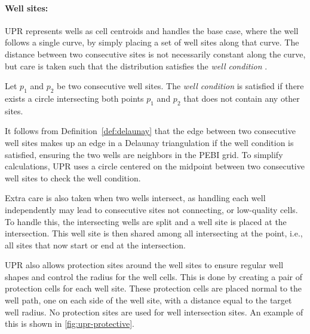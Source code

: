 \paragraph{Well sites:}
\label{UPR:wells}
UPR represents wells as cell centroids and handles the base case, where the well follows a single curve, by simply placing a set of well sites along that curve. The distance between two consecutive sites is not necessarily constant along the curve, but care is taken such that the distribution satisfies the \emph{well condition} \cite{UPR_thesis}.

\begin{definition}
Let $p_1$ and $p_2$ be two consecutive well sites. The \emph{well condition} is satisfied if there exists a circle intersecting both points $p_1$ and $p_2$ that does not contain any other sites.
\end{definition}

It follows from Definition~\ref{def:delaunay} that the edge between two consecutive well sites makes up an edge in a Delaunay triangulation if the well condition is satisfied, ensuring the two wells are neighbors in the PEBI grid. To simplify calculations, UPR uses a circle centered on the midpoint between two consecutive well sites to check the well condition.

Extra care is also taken when two wells intersect, as handling each well independently may lead to consecutive sites not connecting, or low-quality cells. To handle this, the intersecting wells are split and a well site is placed at the intersection. This well site is then shared among all intersecting at the point, i.e., all sites that now start or end at the intersection. 

UPR also allows protection sites around the well sites to ensure regular well shapes and control the radius for the well cells. This is done by creating a pair of protection cells for each well site. These protection cells are placed normal to the well path, one on each side of the well site, with a distance equal to the target well radius. No protection sites are used for well intersection sites. An example of this is shown in \autoref{fig:upr-protective}.

